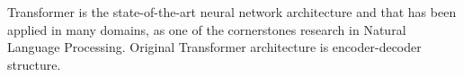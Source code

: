 Transformer is the state-of-the-art neural network architecture and that has been applied in many domains, as one of the cornerstones research in Natural Language Processing. Original Transformer architecture is encoder-decoder structure. 